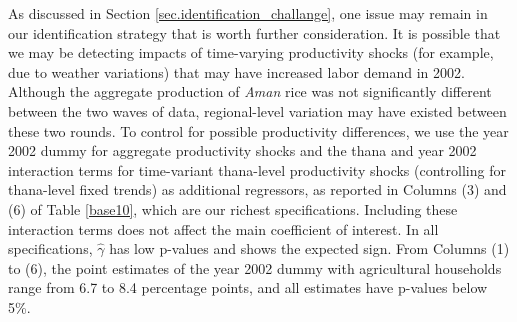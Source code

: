 \documentclass[12pt,letterpaper]{article}
\newcommand{\0}{\ensuremath{\mbox{\boldmath $0$}}}
\begin{document}
As discussed in Section \ref{sec.identification_challange}, one issue may remain in our identification strategy that is worth further consideration. It is possible that we may be detecting impacts of time-varying productivity shocks (for example, due to weather variations) that may have increased labor demand in 2002. Although the aggregate production of \textit{Aman} rice was not significantly different between the two waves of data, regional-level variation may have existed between these two rounds. To control for possible productivity differences, we use the year 2002 dummy for aggregate productivity shocks and the thana and year 2002 interaction terms for time-variant thana-level productivity shocks (controlling for thana-level fixed trends) as additional regressors, as reported in Columns (3) and (6) of Table \ref{base10}, which are our richest specifications. Including these interaction terms does not affect the main coefficient of interest. In all specifications, $\hat{\gamma}$ has low p-values and shows the expected sign. From Columns (1) to (6), the point estimates of the year 2002 dummy with agricultural households range from 6.7 to 8.4 percentage points, and all estimates have p-values below 5\%. 
\end{document}

